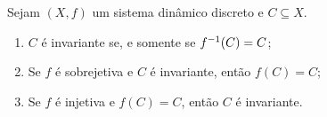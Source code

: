 \begin{exercise}
Sejam $(X,f)$ um sistema dinâmico discreto e $C \subseteq X$.
	\begin{enumerate}
	\item $C$ é invariante se, e somente se $f^{-1}(C)=C$;
	\item Se $f$ é sobrejetiva e $C$ é invariante, então $f(C)=C$;
	\item Se $f$ é injetiva e $f(C)=C$, então $C$ é invariante.
	\end{enumerate}
\end{exercise}
\begin{comment}
\begin{proof}
	\begin{enumerate}
	\item Provamos cada implicação separadamente.
		\begin{itemize}
		\item [($\Rightarrow$)] Como $C$ é positivamente invariante, vale $f(C) \subseteq C$, logo $f\inv(f(C)) \subseteq f\inv(C)$. Como para qualquer função vale que $C \subseteq f\inv(f(C))$, segue que $C \subseteq f\inv(C)$. Como $C$ é negativamente invariante, vale $f\inv(C) \subseteq C$, portanto $f\inv(C)=C$.

		\item [($\Leftarrow$)] Como $f\inv(C) = C$, segue que $C$ é negativamente invariante. Também dessa relação segue que $f(C) = f(f\inv(C))$ e, como $f(f\inv(C) \subseteq C$ para qualquer função, segue que $f(C) \subseteq C$, portanto $C$ é positivamente invariante, o que mostra que ele é invariante.
		\end{itemize}

	\item Como $f$ é sobrejetiva, vale $f(f\inv(C))=C$. Da invariância negativa de $C$, segue que $f\inv(C) \subseteq C$, portanto $f(f\inv(C)) \subseteq f(C)$. Mas então $C \subseteq ft(C)$. Da invariância positiva de $C$, segue que $f(C) \subseteq C$ e, portanto, $f(C)=C$.

	\item Como $f(C) = C$, segue que $f\inv(C) = f\inv(f(C))$ e, como $f\inv(f(C)) = C$ para função injetiva, segue que $f\inv(C) = C$, portanto $C$ é invariante pela proposição acima. \qedhere
	\end{enumerate}
\end{proof}
\end{comment}

